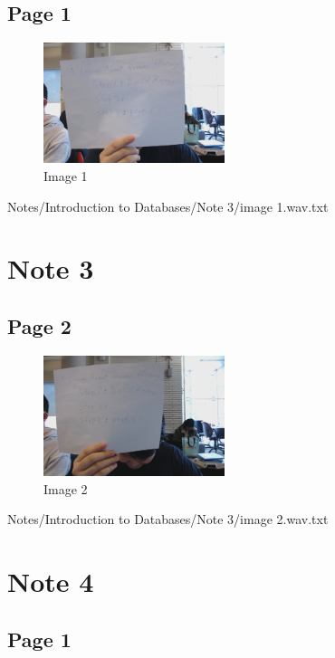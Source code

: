 \documentclass{article}%
\begin{document}
\subsection{Page 1}%
\label{subsec:Page 1}%


\begin{figure}[h!]%
\centering%
\includegraphics[width=200px]{Notes/Introduction to Databases/Note 3/image 1.jpg}%
\caption{Image 1}%
\end{figure}

%
Notes/Introduction to Databases/Note 3/image 1.wav.txt

%
\section{Note 3}%
\label{sec:Note 3}%
\subsection{Page 2}%
\label{subsec:Page 2}%


\begin{figure}[h!]%
\centering%
\includegraphics[width=200px]{Notes/Introduction to Databases/Note 3/image 2.jpg}%
\caption{Image 2}%
\end{figure}

%
Notes/Introduction to Databases/Note 3/image 2.wav.txt

%
\section{Note 4}%
\label{sec:Note 4}%
\subsection{Page 1}%
\label{subsec:Page 1}%
\end{document}
